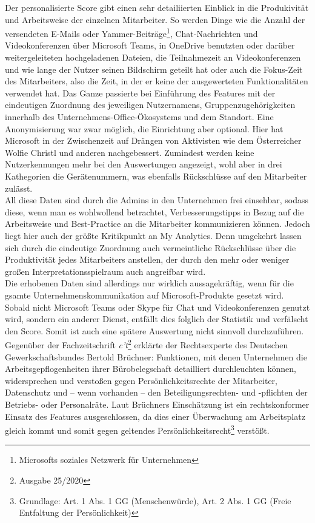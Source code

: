 Der personalisierte Score gibt einen sehr detailiierten Einblick in die Produkivität und Arbeitsweise der einzelnen Mitarbeiter. So werden Dinge wie die Anzahl der versendeten E-Mails oder Yammer-Beiträge\footnote{Microsofts soziales Netzwerk für Unternehmen}, Chat-Nachrichten und Videokonferenzen über Microsoft Teams, in OneDrive benutzten oder  darüber weitergeleiteten hochgeladenen Dateien, die Teilnahmezeit an Videokonferenzen und wie lange der Nutzer seinen Bildschirm geteilt hat oder auch die \glqq Fokus-Zeit\grqq{} des Mitarbeiters, also die Zeit, in der er keine der ausgewerteten Funktionalitäten verwendet hat. Das Ganze passierte bei Einführung des Features mit der eindeutigen Zuordnung des jeweiligen Nutzernamens, Gruppenzugehörigkeiten innerhalb des Unternehmens-Office-Ökosystems und dem Standort. Eine Anonymisierung war zwar möglich, die Einrichtung aber optional. Hier hat Microsoft in der Zwischenzeit auf Drängen von Aktivisten wie dem Österreicher Wolfie Christl und anderen nachgebessert. Zumindest werden keine Nutzerkennungen mehr bei den Auswertungen angezeigt, wohl aber in drei Kathegorien die Gerätenummern, was ebenfalls Rückschlüsse auf den Mitarbeiter zulässt.\\

All diese Daten sind durch die Admins in den Unternehmen frei einsehbar, sodass diese, wenn man es wohlwollend betrachtet, Verbesserungstipps in Bezug auf die Arbeitsweise und Best-Practice an die Mitarbeiter kommunizieren können. Jedoch liegt hier auch der größte Kritikpunkt an My Analytics. Denn umgekehrt lassen sich durch die eindeutige Zuordnung auch vermeintliche Rückschlüsse über die Produktivität jedes Mitarbeiters anstellen, der durch den mehr oder weniger großen Interpretationsspielraum auch angreifbar wird.\\
Die erhobenen Daten sind allerdings nur wirklich aussagekräftig, wenn für die gsamte Unternehmenskommunikation auf Microsoft-Produkte gesetzt wird. Sobald nicht Microsoft Teams oder Skype für Chat und Videokonferenzen genutzt wird, sondern ein anderer Dienst, entfällt dies folglich der Statistik und verfälscht den Score. Somit ist auch eine spätere Auswertung nicht sinnvoll durchzuführen.\\

Gegenüber der Fachzeitschrift \textit{c't}\footnote{Ausgabe 25/2020} erklärte der Rechtsexperte des Deutschen Gewerkschaftsbundes Bertold Brüchner: \glqq Funktionen, mit denen Unternehmen die Arbeitsgepflogenheiten ihrer Bürobelegschaft detailliert durchleuchten können, widersprechen und verstoßen gegen Persönlichkeitsrechte der Mitarbeiter, Datenschutz und – wenn vorhanden – den Beteiligungsrechten- und -pflichten der Betriebs- oder Personalräte.\grqq{} Laut Brüchners Einschätzung ist ein rechtskonformer Einsatz des Features ausgeschlossen, da dies einer Überwachung am Arbeitsplatz gleich kommt und somit gegen geltendes Persönlichkeitsrecht\footnote{Grundlage: Art. 1 Abs. 1 GG (Menschenwürde), Art. 2 Abs. 1 GG (Freie Entfaltung der Persönlichkeit)} verstößt.

